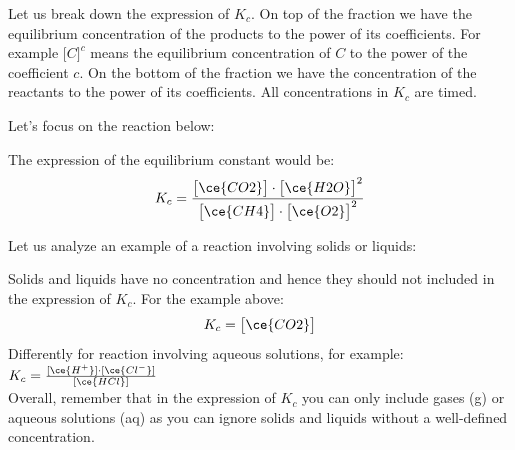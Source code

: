 \documentclass[main.tex]{subfiles}
\begin{document}
\begin{description}
Let us break down the expression of $K_c$. On top of the fraction we have the equilibrium concentration of the products to the power of its coefficients. For example $\big[ C \big]^c$ means the equilibrium concentration of $C$ to the power of the coefficient $c$. On the bottom of the fraction we have  the concentration of the reactants to the power of its coefficients. All concentrations in $K_{c}$ are timed.
 \begin{center}\end{center}
Let's focus on the reaction below:
\begin{center}\end{center}
The expression of the equilibrium constant would be:
\begin{equation*}
  K_{c}=\frac{\big[ \ce{CO2} \big] \cdot \big[ \ce{H2O} \big]^2} {\big[ \ce{CH4} \big] \cdot \big[ \ce{O2} \big]^2} 
\end{equation*}


\item[\docfilehook{Equilibrium involving solids, liquids and solutions}{Equilibrium involving solids, liquids and solutions}] 
Let us analyze an example of a reaction involving solids or liquids:
\begin{center}\end{center}
Solids and liquids have no concentration and hence they should not included in the expression of $K_c$. For the example above:
\begin{equation*}
  K_{c}=\big[ \ce{CO2} \big]
\end{equation*}
Differently for reaction involving aqueous solutions, for example:
\\\hfill $K_{c}=\frac{[\ce{H^+}]\cdot [\ce{Cl^-}]}{[\ce{HCl}]}$\\
Overall, remember that in the expression of $K_c$ you can only include gases (g) or aqueous solutions (aq) as you can ignore solids and liquids without a well-defined concentration.


\end{description}
\end{document}
